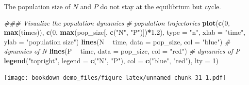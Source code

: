 \documentclass[
]{book}
\newenvironment{Shaded}{\begin{snugshade}}{\end{snugshade}}
\newcommand{\CommentTok}[1]{\textcolor[rgb]{0.56,0.35,0.01}{\textit{#1}}}
\newcommand{\DataTypeTok}[1]{\textcolor[rgb]{0.13,0.29,0.53}{#1}}
\newcommand{\DecValTok}[1]{\textcolor[rgb]{0.00,0.00,0.81}{#1}}
\newcommand{\FloatTok}[1]{\textcolor[rgb]{0.00,0.00,0.81}{#1}}
\newcommand{\KeywordTok}[1]{\textcolor[rgb]{0.13,0.29,0.53}{\textbf{#1}}}
\newcommand{\NormalTok}[1]{#1}
\newcommand{\OperatorTok}[1]{\textcolor[rgb]{0.81,0.36,0.00}{\textbf{#1}}}
\newcommand{\StringTok}[1]{\textcolor[rgb]{0.31,0.60,0.02}{#1}}
\begin{document}
The population size of \(N\) and \(P\) do not stay at the equilibrium but cycle.

\begin{Shaded}
\begin{Highlighting}[]
\CommentTok{### Visualize the population dynamics}
\CommentTok{# population trajectories}
\KeywordTok{plot}\NormalTok{(}\KeywordTok{c}\NormalTok{(}\DecValTok{0}\NormalTok{, }\KeywordTok{max}\NormalTok{(times)), }\KeywordTok{c}\NormalTok{(}\DecValTok{0}\NormalTok{, }\KeywordTok{max}\NormalTok{(pop_size[, }\KeywordTok{c}\NormalTok{(}\StringTok{"N"}\NormalTok{, }\StringTok{"P"}\NormalTok{)])}\OperatorTok{*}\FloatTok{1.2}\NormalTok{), }\DataTypeTok{type =} \StringTok{"n"}\NormalTok{, }\DataTypeTok{xlab =} \StringTok{"time"}\NormalTok{, }\DataTypeTok{ylab =} \StringTok{"population size"}\NormalTok{)}
\KeywordTok{lines}\NormalTok{(N }\OperatorTok{~}\StringTok{ }\NormalTok{time, }\DataTypeTok{data =}\NormalTok{ pop_size, }\DataTypeTok{col =} \StringTok{"blue"}\NormalTok{) }\CommentTok{# dynamics of N}
\KeywordTok{lines}\NormalTok{(P }\OperatorTok{~}\StringTok{ }\NormalTok{time, }\DataTypeTok{data =}\NormalTok{ pop_size, }\DataTypeTok{col =} \StringTok{"red"}\NormalTok{) }\CommentTok{# dynamics of P}
\KeywordTok{legend}\NormalTok{(}\StringTok{"topright"}\NormalTok{, }\DataTypeTok{legend =} \KeywordTok{c}\NormalTok{(}\StringTok{"N"}\NormalTok{, }\StringTok{"P"}\NormalTok{), }\DataTypeTok{col =} \KeywordTok{c}\NormalTok{(}\StringTok{"blue"}\NormalTok{, }\StringTok{"red"}\NormalTok{), }\DataTypeTok{lty =} \DecValTok{1}\NormalTok{)}
\end{Highlighting}
\end{Shaded}

\texttt{[image: bookdown-demo\_files/figure-latex/unnamed-chunk-31-1.pdf]}
\end{document}
